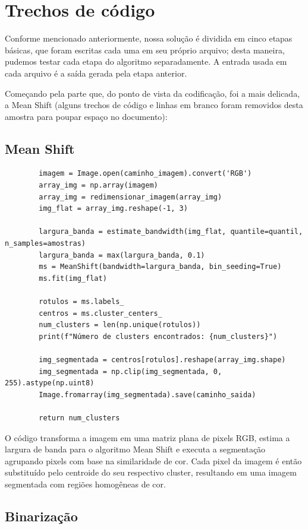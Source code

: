 \documentclass{article}
\begin{document}
\section{Trechos de código}

Conforme mencionado anteriormente, nossa solução é dividida em cinco etapas básicas, que foram escritas cada uma em seu próprio arquivo; desta maneira, pudemos testar cada etapa do algoritmo separadamente. A entrada usada em cada arquivo é a saída gerada pela etapa anterior.

Começando pela parte que, do ponto de vista da codificação, foi a mais delicada, a Mean Shift (alguns trechos de código e linhas em branco foram removidos desta amostra para poupar espaço no documento):

\subsection{Mean Shift}

\begin{verbatim}
        imagem = Image.open(caminho_imagem).convert('RGB')
        array_img = np.array(imagem)
        array_img = redimensionar_imagem(array_img)
        img_flat = array_img.reshape(-1, 3)

        largura_banda = estimate_bandwidth(img_flat, quantile=quantil, n_samples=amostras)
        largura_banda = max(largura_banda, 0.1)
        ms = MeanShift(bandwidth=largura_banda, bin_seeding=True)
        ms.fit(img_flat)

        rotulos = ms.labels_
        centros = ms.cluster_centers_
        num_clusters = len(np.unique(rotulos))
        print(f"Número de clusters encontrados: {num_clusters}")

        img_segmentada = centros[rotulos].reshape(array_img.shape)
        img_segmentada = np.clip(img_segmentada, 0, 255).astype(np.uint8)
        Image.fromarray(img_segmentada).save(caminho_saida)

        return num_clusters
\end{verbatim}

O código transforma a imagem em uma matriz plana de pixels RGB, estima a largura de banda para o algoritmo Mean Shift e executa a segmentação agrupando pixels com base na similaridade de cor. Cada pixel da imagem é então substituído pelo centroide do seu respectivo cluster, resultando em uma imagem segmentada com regiões homogêneas de cor.

\subsection{Binarização}
\end{document}
